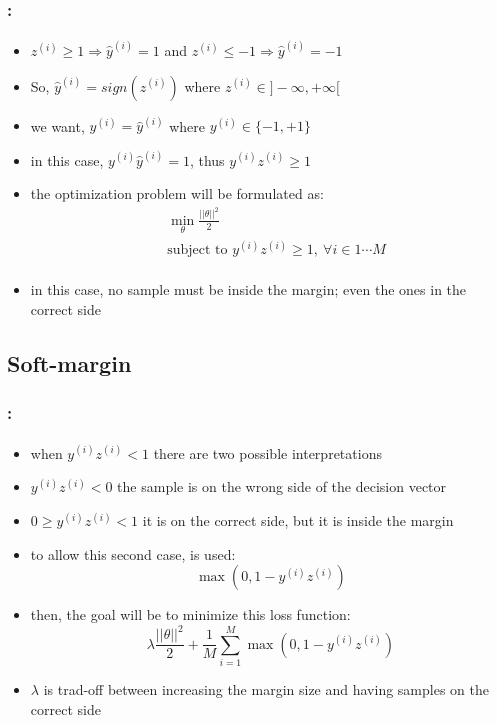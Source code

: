 \documentclass[xcolor=table]{beamer}
\begin{document}
\begin{frame}
	\frametitle{\insertshortsubtitle: \insertsection}
	\framesubtitle{\insertsubsection}
	
	\begin{itemize}
		\item $ z^{(i)} \ge 1 \Rightarrow \hat{y}^{(i)} = 1 $ and $ z^{(i)} \le -1 \Rightarrow \hat{y}^{(i)} = -1 $
		\item So, $ \hat{y}^{(i)} = sign(z^{(i)}) $ where $ z^{(i)} \in ]-\infty, +\infty[ $
		\item we want, $ y^{(i)} =  \hat{y}^{(i)} $ where $ y^{(i)} \in \{-1, +1\} $ 
		\item in this case, $ y^{(i)} \hat{y}^{(i)} = 1 $, thus $ y^{(i)} z^{(i)} \ge 1 $
		\item the optimization problem will be formulated as:
		\begin{align*}
			& \min_\theta \frac{||\theta||^2}{2}  \\
			& \text{subject to } y^{(i)} z^{(i)} \ge 1,\ \forall i \in {1 \cdots M} \\
		\end{align*}
		
		\item in this case, no sample must be inside the margin; even the ones in the correct side
	\end{itemize}
	
\end{frame}

\subsection{Soft-margin}

\begin{frame}
	\frametitle{\insertshortsubtitle: \insertsection}
	\framesubtitle{\insertsubsection}
	
	\begin{itemize}
		\item when $y^{(i)} z^{(i)} < 1 $ there are two possible interpretations 
		\item $y^{(i)} z^{(i)} < 0 $ the sample is on the wrong side of the decision vector
		\item $0 \ge y^{(i)} z^{(i)} < 1 $ it is on the correct side, but it is inside the margin 
		\item to allow this second case,  is used:
		\[\max (0, 1 - y^{(i)} z^{(i)})\]
		\item then, the goal will be to minimize this loss function:
		\[\lambda \frac{||\theta||^2}{2}  + \frac{1}{M} \sum_{i=1}^{M} \max (0, 1 - y^{(i)} z^{(i)}) \]
		\item $ \lambda $ is trad-off between increasing the margin size and having samples on the correct side
	\end{itemize}
	
\end{frame}
\end{document}

